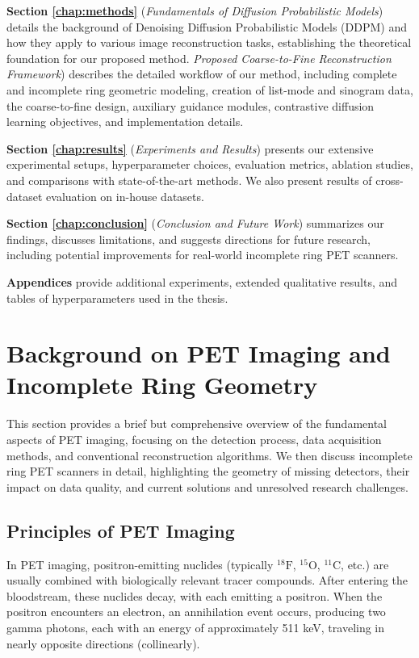 \documentclass[
reprint,
superscriptaddress,
nofootinbib,
amsmath,amssymb,
aps,
prd,
]{revtex4-2}
\begin{document}
\textbf{Section \ref{chap:methods}} (\emph{Fundamentals of Diffusion Probabilistic Models}) details the background of Denoising Diffusion Probabilistic Models (DDPM) and how they apply to various image reconstruction tasks, establishing the theoretical foundation for our proposed method. \emph{Proposed Coarse-to-Fine Reconstruction Framework}) describes the detailed workflow of our method, including complete and incomplete ring geometric modeling, creation of list-mode and sinogram data, the coarse-to-fine design, auxiliary guidance modules, contrastive diffusion learning objectives, and implementation details.

\textbf{Section \ref{chap:results}} (\emph{Experiments and Results}) presents our extensive experimental setups, hyperparameter choices, evaluation metrics, ablation studies, and comparisons with state-of-the-art methods. We also present results of cross-dataset evaluation on in-house datasets.

\textbf{Section \ref{chap:conclusion}} (\emph{Conclusion and Future Work}) summarizes our findings, discusses limitations, and suggests directions for future research, including potential improvements for real-world incomplete ring PET scanners.

\textbf{Appendices} provide additional experiments, extended qualitative results, and tables of hyperparameters used in the thesis.


\section{Background on PET Imaging and Incomplete Ring Geometry}
\label{chap:background}


This section provides a brief but comprehensive overview of the fundamental aspects of PET imaging, focusing on the detection process, data acquisition methods, and conventional reconstruction algorithms. We then discuss incomplete ring PET scanners in detail, highlighting the geometry of missing detectors, their impact on data quality, and current solutions and unresolved research challenges.

\subsection{Principles of PET Imaging}
In PET imaging, positron-emitting nuclides (typically $^{18}\text{F}$, $^{15}\text{O}$, $^{11}\text{C}$, etc.) are usually combined with biologically relevant tracer compounds. After entering the bloodstream, these nuclides decay, with each emitting a positron. When the positron encounters an electron, an annihilation event occurs, producing two gamma photons, each with an energy of approximately 511 keV, traveling in nearly opposite directions (collinearly).
\end{document}
